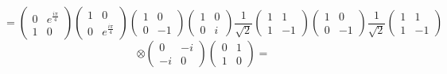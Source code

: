 \documentclass[12pt]{article}
\begin{document}
$$=\begin{pmatrix} 0 & e^{\frac{i\pi}{4}}\\ 1 &0 \end{pmatrix}\begin{pmatrix} 1 & 0 \\ 0 & e^{\frac{i\pi}{4}}\end{pmatrix}
\begin{pmatrix} 1 & 0 \\ 0 & -1\end{pmatrix}\begin{pmatrix} 1 & 0 \\ 0 & i\end{pmatrix}\frac{1}{\sqrt{2}}\begin{pmatrix} 1 & 1\\ 1 &-1\end{pmatrix}\begin{pmatrix} 1 & 0 \\ 0 & -1\end{pmatrix}
\frac{1}{\sqrt{2}}\begin{pmatrix} 1 & 1\\ 1 &-1\end{pmatrix}$$
$$ \otimes\begin{pmatrix} 0 & -i \\ -i & 0 \end{pmatrix}\begin{pmatrix} 0 & 1 \\ 1 & 0\end{pmatrix}  = 
$$
\end{document}
